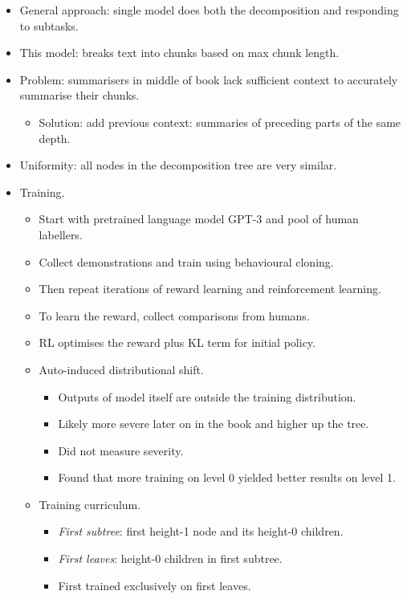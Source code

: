 \begin{itemize}
    \item General approach: single model does both the decomposition and responding to subtasks.
    \item This model: breaks text into chunks based on max chunk length.
    \item Problem: summarisers in middle of book lack sufficient context to accurately summarise their chunks.
    \begin{itemize}
        \item Solution: add previous context: summaries of preceding parts of the same depth.
    \end{itemize}
    \item Uniformity: all nodes in the decomposition tree are very similar.
    \item Training.
    \begin{itemize}
        \item Start with pretrained language model GPT-3 and pool of human labellers.
        \item Collect demonstrations and train using behavioural cloning.
        \item Then repeat iterations of reward learning and reinforcement learning.
        \item To learn the reward, collect comparisons from humans.
        \item RL optimises the reward plus KL term for initial policy.
        \pagebreak
        \item Auto-induced distributional shift.
        \begin{itemize}
            \item Outputs of model itself are outside the training distribution.
            \item Likely more severe later on in the book and higher up the tree.
            \item Did not measure severity.
            \item Found that more training on level 0 yielded better results on level 1.
        \end{itemize}
        \item Training curriculum.
        \begin{itemize}
            \item \emph{First subtree}: first height-1 node and its height-0 children.
            \item \emph{First leaves}: height-0 children in first subtree.
            \item First trained exclusively on first leaves.

\end{itemize}
\end{itemize}
\end{itemize}
